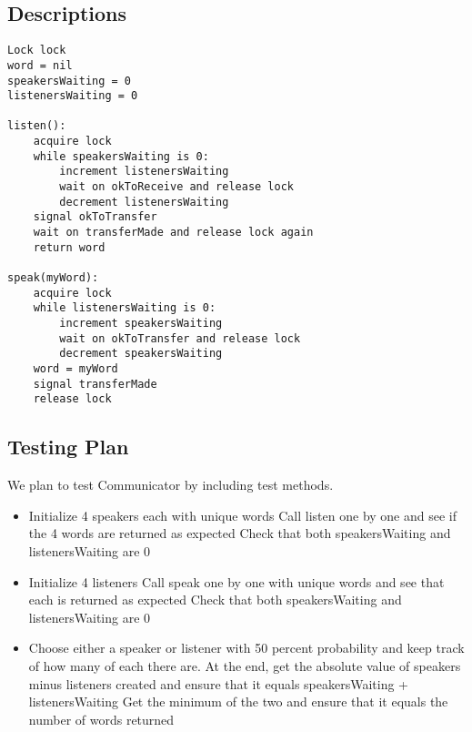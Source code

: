 \documentclass{article}
\begin{document}
\subsection*{Descriptions}

\begin{lstlisting}[frame=single]
Lock lock
word = nil
speakersWaiting = 0
listenersWaiting = 0

listen():
    acquire lock
    while speakersWaiting is 0:
        increment listenersWaiting
        wait on okToReceive and release lock
        decrement listenersWaiting
    signal okToTransfer
    wait on transferMade and release lock again
    return word

speak(myWord):
    acquire lock
    while listenersWaiting is 0:
        increment speakersWaiting
        wait on okToTransfer and release lock
        decrement speakersWaiting
    word = myWord
    signal transferMade
    release lock
\end{lstlisting}

\subsection*{Testing Plan}
We plan to test Communicator by including test methods.
\begin{itemize}
\item Initialize 4 speakers each with unique words
\subitem Call listen one by one and see if the 4 words are returned as expected
\subitem Check that both speakersWaiting and listenersWaiting are 0
\item Initialize 4 listeners
\subitem Call speak one by one with unique words and see that each is returned as expected
\subitem Check that both speakersWaiting and listenersWaiting are 0
\item Choose either a speaker or listener with 50 percent probability and keep track of how many of each there are.
\subitem At the end, get the absolute value of speakers minus listeners created and ensure that it equals speakersWaiting + listenersWaiting
\subitem Get the minimum of the two and ensure that it equals the number of words returned
\end{itemize}
\end{document}

